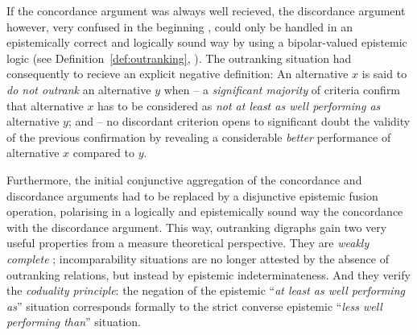 If the concordance argument was always well recieved, the discordance argument however, very confused in the beginning \citep{ROY-1966}, could only be handled in an epistemically correct and logically sound way by using a bipolar-valued epistemic logic (see Definition~\ref{def:outranking}, \citet{BIS-2013}). The outranking situation had consequently to recieve an explicit negative definition: An alternative $x$ is said to \emph{do not outrank} an alternative $y$ when – a \emph{significant majority} of criteria confirm that alternative $x$ has to be considered as \emph{not at least as well performing as} alternative $y$; and – no discordant criterion opens to significant doubt the validity of the previous confirmation by revealing a considerable \emph{better} performance of alternative $x$ compared to $y$.

Furthermore, the initial conjunctive aggregation of the concordance and discordance arguments had to be replaced by a disjunctive epistemic fusion operation, polarising in a logically and epistemically sound way the concordance with the discordance argument. This way, outranking  digraphs gain two very useful properties from a measure theoretical perspective. They are \emph{weakly complete} ; incomparability situations are no longer attested by the absence of outranking relations, but instead by epistemic indeterminateness. And they verify the \emph{coduality principle}: the negation of the epistemic ``\emph{at least as well performing as}'' situation corresponds formally to the strict converse epistemic ``\emph{less well performing than}'' situation.


\clearpage


%